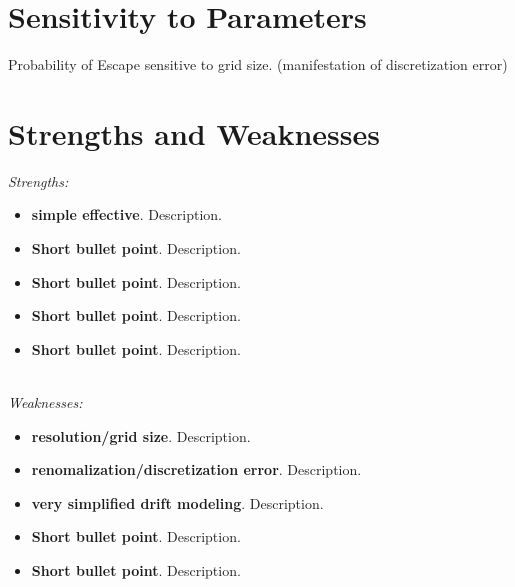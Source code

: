 \documentclass[12pt, letterpaper]{article}  %
\theoremstyle{definition}
\theoremstyle{remark}
\theoremstyle{plain}
\begin{document}









\section{Sensitivity to Parameters}\label{sec:sensitive}


Probability of Escape sensitive to grid size. (manifestation of discretization error)



\section{Strengths and Weaknesses}\label{sec:sandw}


\textit{Strengths:}
\begin{itemize}
\item \textbf{simple effective}.  Description.
\item \textbf{Short bullet point}.  Description.
\item \textbf{Short bullet point}.  Description.
\item \textbf{Short bullet point}.  Description.
\item \textbf{Short bullet point}.  Description.
\end{itemize}
\ \\
\noindent \textit{Weaknesses:}
\begin{itemize}
\item \textbf{resolution/grid size}.  Description.
\item \textbf{renomalization/discretization error}.  Description.
\item \textbf{very simplified drift modeling}.  Description.
\item \textbf{Short bullet point}.  Description.
\item \textbf{Short bullet point}.  Description.
\end{itemize}
\end{document}
